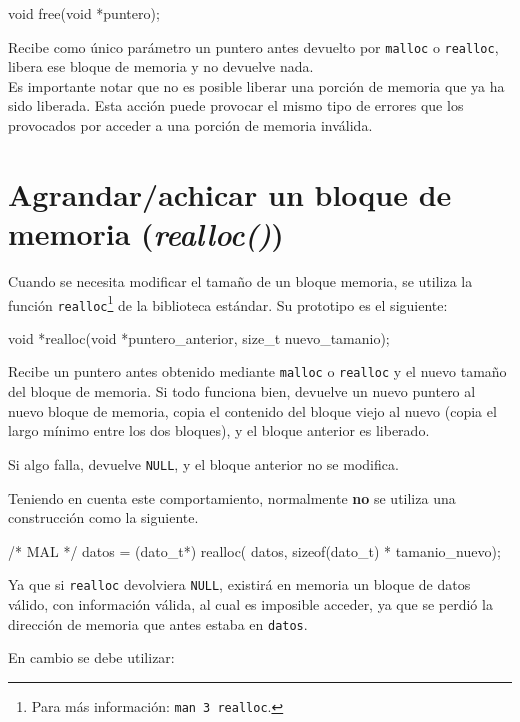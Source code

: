 \begin{codigo-c-plano}
void free(void *puntero);
\end{codigo-c-plano}

Recibe como único parámetro un puntero antes devuelto por \lstinline!malloc! o
\lstinline!realloc!, libera ese bloque de memoria y no devuelve nada. \\

Es importante notar que no es posible liberar una porción de memoria que ya ha
sido liberada.  Esta acción puede provocar el mismo tipo de errores que los
provocados por acceder a una porción de memoria inválida. 

\section{Agrandar/achicar un bloque de memoria (\textit{realloc()})}

Cuando se necesita modificar el tamaño de un bloque memoria, se utiliza la
función \lstinline!realloc!\footnote{Para más información: \texttt{man 3
realloc}.} de la biblioteca estándar. Su prototipo es el siguiente:

\begin{codigo-c-plano}
void *realloc(void *puntero_anterior, size_t nuevo_tamanio);
\end{codigo-c-plano}

Recibe un puntero antes obtenido mediante \lstinline!malloc! o
\lstinline!realloc! y el nuevo tamaño del bloque de memoria. Si todo
funciona bien, devuelve un nuevo puntero al nuevo bloque de memoria, copia el
contenido del bloque viejo al nuevo (copia el largo mínimo entre los dos
bloques), y el bloque anterior es liberado.

Si algo falla, devuelve \lstinline!NULL!, y el bloque anterior no se modifica.

Teniendo en cuenta este comportamiento, normalmente \textbf{no} se utiliza una
construcción como la siguiente.

\begin{codigo-c-plano}
/* MAL */
datos = (dato_t*) realloc( datos, sizeof(dato_t) * tamanio_nuevo);
\end{codigo-c-plano}

Ya que si \lstinline!realloc! devolviera \lstinline!NULL!, existirá en memoria
un bloque de datos válido, con información válida, al cual es imposible
acceder, ya que se perdió la dirección de memoria que antes estaba en
\lstinline!datos!.

En cambio se debe utilizar:

